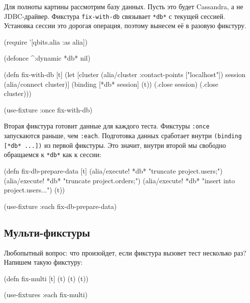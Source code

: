 
Для полноты картины рассмотрим базу данных. Пусть это будет Cassandra, а не
JDBC-драйвер. Фикстура \verb|fix-with-db| связывает \verb|*db*| с текущей
сессией. Установка сессии это дорогая операция, поэтому вынесем её в разовую
фикстуру.

\begin{english}
  \begin{clojure}
(require '[qbits.alia :as alia])

(defonce ^:dynamic *db* nil)

(defn fix-with-db [t]
  (let [cluster (alia/cluster {:contact-points ["localhost"]})
        session (alia/connect cluster)]
    (binding [*db* session]
      (t))
    (.close session)
    (.close cluster)))

(use-fixture :once fix-with-db)
  \end{clojure}
\end{english}

Вторая фикстура готовит данные для каждого теста. Фикстуры \verb|:once|
запускаются раньше, чем \verb|:each|. Подготовка данных сработает внутри
\verb|(binding [*db* ...])| из первой фикстуры. Это значит, внутри второй мы
свободно обращаемся к \verb|*db*| как к сессии:


\begin{english}
  \begin{clojure}
(defn fix-db-prepare-data [t]
  (alia/execute! *db* "truncate project.users;")
  (alia/execute! *db* "truncate project.orders;")
  (alia/execute! *db* "insert into project.users...")
  (t))

(use-fixture :each fix-db-prepare-data)
  \end{clojure}
\end{english}

\subsection{Мульти-фикстуры}

\label{multi-fixture}


Любопытный вопрос: что произойдет, если фикстура вызовет тест несколько раз?
Напишем такую фикстуру:

\begin{english}
  \begin{clojure}
(defn fix-multi [t]
  (t) (t) (t))

(use-fixtures :each fix-multi)
  \end{clojure}
\end{english}

